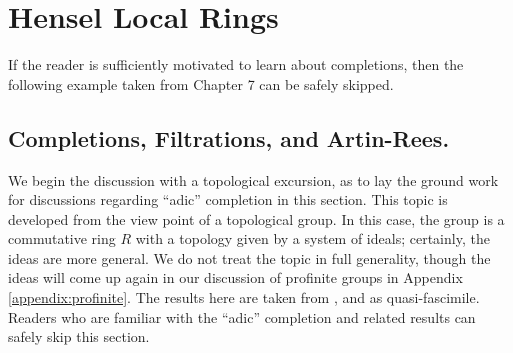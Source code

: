 \chapter{Hensel Local Rings}

If the reader is sufficiently motivated to learn about 
completions, then the following example taken from \cite{Eisenbud}
Chapter 7 can be safely skipped.

\section{Completions, Filtrations, and Artin-Rees.}

We begin the discussion with a topological excursion, as to lay 
the ground work for discussions regarding ``adic'' completion in 
this section. This topic is developed from the view point of a 
topological group. In this case, the group is a commutative ring 
$R$ with a topology given by a system of ideals; certainly, the 
ideas are more general. We do not treat the topic in full 
generality, though the ideas will come up again in our discussion 
of profinite groups in Appendix \ref{appendix:profinite}. The
results here are taken from \cite{AM}, \cite{MatsCA} and 
\cite{Eisenbud} as quasi-fascimile. Readers who are familiar with
the ``adic'' completion and related results can safely skip this
section.






